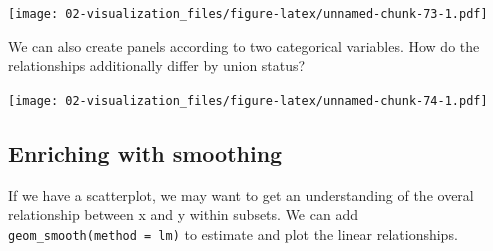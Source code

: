 \documentclass[
]{book}
\newenvironment{Shaded}{\begin{snugshade}}{\end{snugshade}}
\newcommand{\DataTypeTok}[1]{\textcolor[rgb]{0.13,0.29,0.53}{#1}}
\newcommand{\KeywordTok}[1]{\textcolor[rgb]{0.13,0.29,0.53}{\textbf{#1}}}
\newcommand{\NormalTok}[1]{#1}
\newcommand{\OperatorTok}[1]{\textcolor[rgb]{0.81,0.36,0.00}{\textbf{#1}}}
\newcommand{\StringTok}[1]{\textcolor[rgb]{0.31,0.60,0.02}{#1}}
\begin{document}
\texttt{[image: 02-visualization\_files/figure-latex/unnamed-chunk-73-1.pdf]}

We can also create panels according to two categorical variables. How do the relationships additionally differ by union status?

\begin{Shaded}
\end{Shaded}

\texttt{[image: 02-visualization\_files/figure-latex/unnamed-chunk-74-1.pdf]}

\hypertarget{enriching-with-smoothing}{%
\subsection{Enriching with smoothing}\label{enriching-with-smoothing}}

If we have a scatterplot, we may want to get an understanding of the overal relationship between x and y within subsets. We can add \texttt{geom\_smooth(method\ =\ \textquotesingle{}lm\textquotesingle{})} to estimate and plot the linear relationships.

\begin{Shaded}
\end{Shaded}
\end{document}
